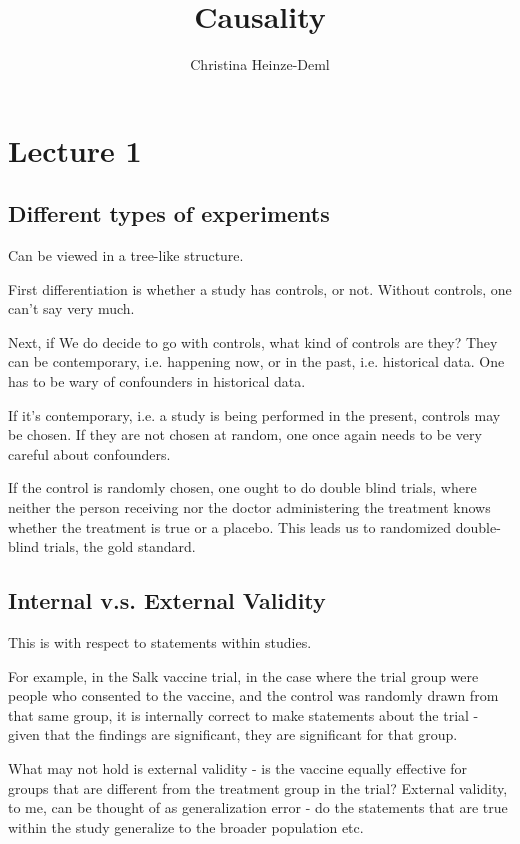 \documentclass{article}
\begin{document}
\title{Causality}
\author{	Christina Heinze-Deml}
\date{}

\maketitle

\section{Lecture 1}

	\subsection{Different types of experiments}
	
		Can be viewed in a tree-like structure.
		
		First differentiation is whether a study has controls, or not. Without controls, one can't say very much.
		
		Next, if We do decide to go with controls, what kind of controls are they? They can be contemporary, i.e. happening now, or in the past, i.e. historical data. One has to be wary of confounders in historical data. 
		
		If it's contemporary, i.e. a study is being performed in the present, controls may be chosen. If they are not chosen at random, one once again needs to be very careful about confounders.
		
		If the control is randomly chosen, one ought to do double blind trials, where neither the person receiving nor the doctor administering the treatment knows whether the treatment is true or a placebo. This leads us to randomized double-blind trials, the gold standard.
		
	\subsection{Internal v.s. External Validity}
		
		This is with respect to statements within studies.
		
		For example, in the Salk vaccine trial, in the case where the trial group were people who consented to the vaccine, and the control was randomly drawn from that same group, it is internally correct to make statements about the trial - given that the findings are significant, they are significant for that group.
		
		What may not hold is external validity - is the vaccine equally effective for groups that are different from the treatment group in the trial? External validity, to me, can be thought of as generalization error - do the statements that are true within the study generalize to the broader population etc.
		
\end{document}
